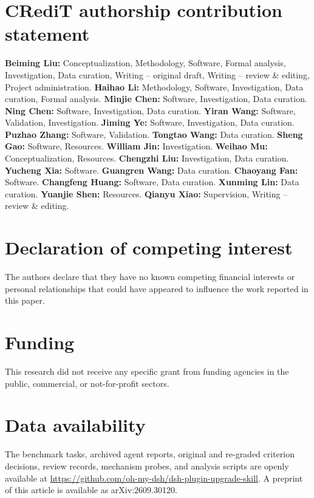 
\section*{CRediT authorship contribution statement}
\textbf{Beiming Liu:} Conceptualization, Methodology, Software, Formal analysis, Investigation, Data curation, Writing -- original draft, Writing -- review \& editing, Project administration.
\textbf{Haihao Li:} Methodology, Software, Investigation, Data curation, Formal analysis.
\textbf{Minjie Chen:} Software, Investigation, Data curation.
\textbf{Ning Chen:} Software, Investigation, Data curation.
\textbf{Yiran Wang:} Software, Validation, Investigation.
\textbf{Jiming Ye:} Software, Investigation, Data curation.
\textbf{Puzhao Zhang:} Software, Validation.
\textbf{Tongtao Wang:} Data curation.
\textbf{Sheng Gao:} Software, Resources.
\textbf{William Jin:} Investigation.
\textbf{Weihao Mu:} Conceptualization, Resources.
\textbf{Chengzhi Liu:} Investigation, Data curation.
\textbf{Yucheng Xia:} Software.
\textbf{Guangren Wang:} Data curation.
\textbf{Chaoyang Fan:} Software.
\textbf{Changfeng Huang:} Software, Data curation.
\textbf{Xunming Lin:} Data curation.
\textbf{Yuanjie Shen:} Resources.
\textbf{Qianyu Xiao:} Supervision, Writing -- review \& editing.

\section*{Declaration of competing interest}
The authors declare that they have no known competing financial interests or personal relationships that could have appeared to influence the work reported in this paper.

\section*{Funding}
This research did not receive any specific grant from funding agencies in the public, commercial, or not-for-profit sectors.

\section*{Data availability}
The benchmark tasks, archived agent reports, original and re-graded criterion decisions, review records, mechanism probes, and analysis scripts are openly available at \url{https://github.com/oh-my-dsh/dsh-plugin-upgrade-skill}. A preprint of this article is available as arXiv:2609.30120.

